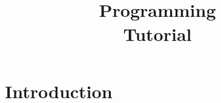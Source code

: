 \documentclass[10pt]{report}
\title{\converse{}\\Programming\\Tutorial}
\begin{document}
\maketitle

\chapter{Introduction}
\end{document}
